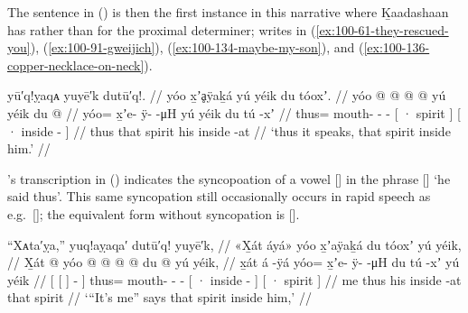 The sentence in (\lastx) is then the first instance in this narrative where Ḵaadashaan has  rather than  for the proximal determiner; \citeauthor{swanton:1909} writes  in (\ref{ex:100-61-they-rescued-you}), (\ref{ex:100-91-gweijich}), (\ref{ex:100-134-maybe-my-son}), and (\ref{ex:100-136-copper-necklace-on-neck}).

\ex\label{ex:100-152-thus-said-inside}%
%
\begingl
	\glpreamble	yū′q!ỵaqᴀ yuyē′k dutū′q!. //
	\glpreamble	yóo x̱ʼḁÿaḵá yú yéik du tóoxʼ. //
	\gla	yóo @  @ {} @ {} @ {}
		{} yú yéik {}
		{} du  @ {} {} //
	\glb	yóo= x̱ʼe- ÿ-  -μH
		{} yú yéik {}
		{} du tú -xʼ {} //
	\glc	thus= mouth- -  -
		{}[ · spirit {}]
		{}[ · inside - {}] //
	\gld	thus  {} {} {}
		{} that spirit {}
		{} his inside -at {} //
	\glft	‘thus it speaks, that spirit inside him.’
		//
\endgl
\xe

\citeauthor{swanton:1909}’s transcription  in (\lastx) indicates the syncopoation of a vowel  [] in the phrase  [] ‘he said thus’.
This same syncopation still occasionally occurs in rapid speech as e.g.\ []; the equivalent form without syncopation is  [].

\ex\label{ex:100-153-its-me-spirit-inside-him}%
%
\begingl
	\glpreamble	“Xᴀta′ỵa,” yuq!aỵaqa′ dutū′q! yuyē′k, //
	\glpreamble	«\!X̱át áyá\!» yóo x̱ʼaÿaḵá du tóoxʼ yú yéik, //
	\gla	{} {} X̱át {}  @ {} {} 
		yóo @  @ {} @ {} @ {}
		 {} du  @ {} {}
		 {} yú yéik, {} //
	\glb	{} {} x̱át {} á -ÿá {} 
		yóo= x̱ʼe- ÿ-  -μH
		{} du tú -xʼ {}
		{} yú yéik {} //
	\glc	{}[ {}[  {}]  - {}]
		thus= mouth- -  -
		{}[ · inside - {}]
		{}[ · spirit {}] //
	\gld	{} {} me {}  {} {}
		thus  {} {} {}
		{} his inside -at {}
		{} that spirit {} //
	\glft	‘“It’s me” says that spirit inside him,’
		//
\endgl
\xe

